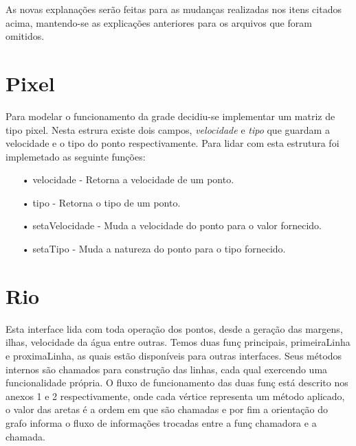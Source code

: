 \documentclass[a4paper,11pt]{article}
\begin{document}
As novas explana\c{c}ões serão feitas para as mudan\c{c}as realizadas nos itens citados acima, mantendo-se as explica\c{c}ões anteriores para os arquivos que foram omitidos.

\section{Pixel}
Para modelar o funcionamento da grade decidiu-se implementar um matriz de tipo pixel. Nesta estrura existe dois campos, \textit{velocidade} e \textit{tipo} que guardam a velocidade e o tipo do ponto respectivamente. Para lidar com esta estrutura foi implemetado as seguinte fun\c{c}ões:
\begin{enumerate}
\item[•]{velocidade - Retorna a velocidade de um ponto.}
\item[•]{tipo - Retorna o tipo de um ponto.} 
\item[•]{setaVelocidade - Muda a velocidade do ponto para o valor fornecido.} 
\item[•]{setaTipo - Muda a natureza do ponto para o tipo fornecido.} 

\end{enumerate}


\section{Rio}
Esta interface lida com toda opera\c{c}ão dos pontos, desde a gera\c{c}ão das margens, ilhas, velocidade da água entre outras. Temos duas fun\c{c} principais, primeiraLinha e proximaLinha, as quais estão disponíveis para outras interfaces. Seus métodos internos são chamados para constru\c{c}ão das linhas, cada qual exercendo uma funcionalidade própria. O fluxo de funcionamento das duas fun\c{c} está descrito nos anexos 1 e 2 respectivamente, onde cada vértice representa um método aplicado, o valor das aretas é a ordem em que são chamadas e por fim a orienta\c{c}ão do grafo informa o fluxo de informa\c{c}ões trocadas entre a fun\c{c} chamadora e a chamada.\\
\end{document}
